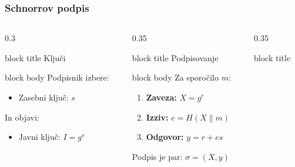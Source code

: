 \documentclass{beamer}
\begin{document}
\begin{frame}
    \frametitle{Schnorrov podpis}

    \begin{columns}[T]
        \begin{column}{0.3\textwidth}
            \begin{beamercolorbox}[sep=0.2cm,center]{block title}
                Ključi
            \end{beamercolorbox}
            \begin{beamercolorbox}[sep=0.2cm,ht=5.5cm]{block body}
                Podpisnik izbere:
                \begin{itemize}
                    \item Zasebni ključ: $s$
                \end{itemize}
                \vspace{0.5cm}
                \vfill
                In objavi:
                \begin{itemize}
                    \item Javni ključ: $I = g^s$
                \end{itemize}
            \end{beamercolorbox}
        \end{column}
        \begin{column}{0.35\textwidth}
            \begin{beamercolorbox}[sep=0.2cm,center]{block title}
                Podpisovanje
            \end{beamercolorbox}
            \begin{beamercolorbox}[sep=0.2cm,ht=5.5cm]{block body}
                Za sporočilo $m$:
                \begin{enumerate}
                    \item \textbf{Zaveza:} $X = g^r$
                    \item \textbf{Izziv:} $e = H(X \mathbin{\|} m)$
                    \item \textbf{Odgovor:} $y = r + es$
                \end{enumerate}
                \vspace{0.5cm}
                \vfill
                Podpis je par: $\sigma = (X, y)$
            \end{beamercolorbox}
        \end{column}
        \begin{column}{0.35\textwidth}
            \begin{beamercolorbox}[sep=0.2cm,center]{block title}

\end{beamercolorbox}
\end{column}
\end{columns}
\end{frame}
\end{document}
